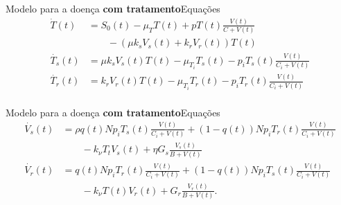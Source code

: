 \documentclass[13pt]{beamer}
\begin{document}
\begin{frame}{Modelo para a doença \textbf{com tratamento}}{Equações}
    \begin{align*}
        \dot{T}( t ) &= S_{ 0 } ( t ) - \mu_{ T } T ( t ) + p T ( t ) \frac{ V ( t ) }{ C + V ( t ) } \\
                     &\qquad - ( \mu k_{ s } V_{ s } ( t ) + k_{ r } V_{ r } ( t ) ) T ( t ) \\
        \dot{T_{ s }} ( t ) &= \mu k_{ s } V_{ s } ( t ) T ( t ) - \mu_{ T_{ i } } T_{ s } ( t ) - p_{ i } T_{ s } ( t ) \frac{ V ( t ) }{ C_{ i } + V ( t ) } \\
        \dot{ T_{ r } } ( t ) &= k_{ r } V_{ r } ( t ) T ( t ) - \mu_{ T_{ i } } T_{ r } ( t ) - p_{ i } T_{ r } ( t ) \frac{ V ( t ) }{ C_{ i } + V ( t ) }  \\
    \end{align*}
\end{frame}

\begin{frame}{Modelo para a doença \textbf{com tratamento}}{Equações}
    \begin{align*}
        \dot{V_{ s } } ( t ) &= \rho q ( t ) N p_{ i } T_{ s } ( t ) \frac{ V ( t ) }{ C_{ i } + V ( t ) } + ( 1 - q ( t ) ) N p_{ i } T_{ r } ( t ) \frac{ V ( t ) }{ C_{ i } + V ( t ) } \\
                             &\qquad - k_{ \nu } T_{ t } V_{ s } ( t ) + \eta G_{ s } \frac{ V_{ s } ( t ) }{ B + V ( t ) } \\
        \dot{ V_{ r }} ( t ) &= q ( t ) N p_{ i } T_{ r } ( t ) \frac{ V ( t ) }{ C_{ i } + V ( t ) } + ( 1 - q ( t ) ) N p_{ i } T_{ s } ( t ) \frac{ V ( t ) }{ C_{ i } + V ( t ) } \\
                             &\qquad - k_{ \nu } T ( t ) V_{ r } ( t ) + G_{ r } \frac{ V_{ r } ( t ) }{ B + V ( t ) }
    .\end{align*}
\end{frame}
\end{document}
